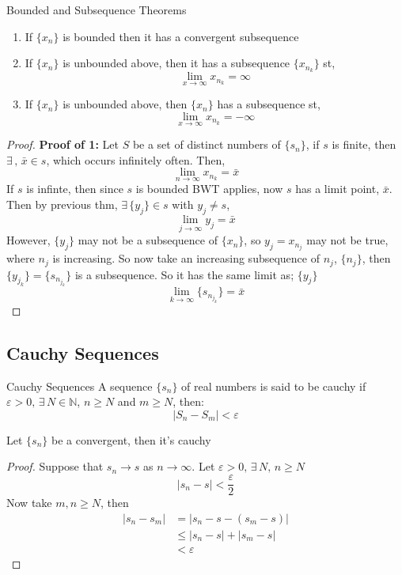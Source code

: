 \documentclass{article}
\newcommand{\N}{\mathbb{N}}
\newcommand{\e}{\varepsilon}
\newcommand{\ex}{\exists\,}
\newcommand{\xb}{\bar{x}}
\begin{document}
{{{{\noindent\begin{theorem}{Bounded and Subsequence Theorems}{}
  \begin{enumerate}
    \item If $\{ x_n \}$ is bounded then it has a convergent subsequence
    \item If $\{ x_n \}$ is unbounded above, then it has a subsequence $\{ x_{n_k} \}$ st,
    $$ \lim_{x\to\infty}{x_{n_k}} = \infty $$
    \item If $\{ x_n \}$ is unbounded above, then $\{ x_n \}$ has a subsequence st,
    $$ \lim_{x\to\infty}{x_{n_k}} = -\infty $$
  \end{enumerate}
\end{theorem}\vspace{10pt}
\begin{proof}
  \textbf{Proof of 1:} Let $S$ be a set of distinct numbers of $\{ s_n \}$, if $s$ is finite, then $\ex,\, \xb\in s$, which occurs infinitely often. Then,
  $$ \lim_{n\to\infty}{x_{n_k}} = \xb $$
  If $s$ is infinte, then since $s$ is bounded BWT applies, now $s$ has a limit point, $\xb$. Then by previous thm, $\ex\{y_j\}\in s$ with $y_j \neq s$,
  $$ \lim_{j\to\infty}{y_j} = \xb $$
  However, $\{ y_j \}$ may not be a subsequence of $\{ x_n \}$, so $y_j = x_{n_j}$ may not be true, where $n_j$ is increasing. So now take an increasing subsequence of $n_j$, $\{ n_j \}$, then $\{ y_{j_k} \} = \{ s_{n_{j_k}} \}$ is a subsequence. So it has the same limit as; $\{ y_j \}$
  $$ \lim_{k\to\infty}{\{ s_{n_{j_k}} \}} = \xb $$
\end{proof}

\subsection{Cauchy Sequences}

\noindent\begin{definition}{Cauchy Sequences}{}
  A sequence $\{ s_n \}$ of real numbers is said to be cauchy if $\e > 0,\,\ex N\in\N$, $n\ge N$ and $m\ge N$, then:
  $$ |S_n - S_m| < \e $$
\end{definition}\vspace{10pt}

\noindent\begin{lemma}{}{}
  Let $\{ s_n \}$ be a convergent, then it's cauchy
\end{lemma}\vspace{10pt}
\begin{proof}
  Suppose that $s_n\to s$ as $n\to\infty$. Let $\e > 0,\,\ex N, \, n\ge N$
  $$ |s_n - s|< \frac{\e}{2} $$
  Now take $m, n \ge N$, then
  \begin{align*}
    |s_n - s_m| &= |s_n - s - (s_m - s)| \\
    &\le |s_n - s| + |s_m - s| \\
    &< \e
  \end{align*}
\end{proof}

}}}}
\end{document}

